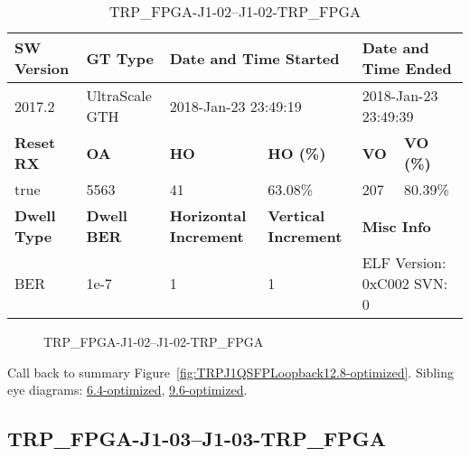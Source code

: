 \begin{table}[h]
\centering
\caption{TRP\_FPGA-J1-02--J1-02-TRP\_FPGA}
\label{tab:TRPFPGAJ102J102TRPFPGA12.8-optimized}
\begin{tabular}{@{}|l|l|l|l|l|l|@{}}
\toprule
\textbf{SW Version}                & \textbf{GT Type}   & \multicolumn{2}{l|}{\textbf{Date and Time Started}}            & \multicolumn{2}{l|}{\textbf{Date and Time Ended}}        \\ \midrule
2017.2                       & UltraScale GTH          & \multicolumn{2}{l|}{2018-Jan-23 23:49:19}                   & \multicolumn{2}{l|}{2018-Jan-23 23:49:39}               \\ \midrule
\textbf{Reset RX}                  & \textbf{OA} & \textbf{HO}   & \textbf{HO (\%)} & \textbf{VO} & \textbf{VO (\%)} \\ \midrule
true & 5563        & 41          & 63.08\%        & 207        & 80.39\%       \\ \midrule
\textbf{Dwell Type}                & \textbf{Dwell BER} & \textbf{Horizontal Increment} & \textbf{Vertical Increment}    & \multicolumn{2}{l|}{\textbf{Misc Info}}                  \\ \midrule
BER                            & 1e-7        & 1        & 1           & \multicolumn{2}{l|}{ELF Version: 0xC002 SVN: 0}                         \\ \bottomrule
\end{tabular}
\end{table}

\begin{figure}[h]
\caption{TRP\_FPGA-J1-02--J1-02-TRP\_FPGA} \label{fig:TRPFPGAJ102J102TRPFPGA12.8-optimized}
\end{figure}

Call back to summary Figure~\ref{fig:TRPJ1QSFPLoopback12.8-optimized}.
Sibling eye diagrams: \hyperref[sec:TRPFPGAJ102J102TRPFPGA6.4-optimized]{6.4-optimized}, \hyperref[sec:TRPFPGAJ102J102TRPFPGA9.6-optimized]{9.6-optimized}.

\clearpage
\newpage


\subsection{TRP\_FPGA-J1-03--J1-03-TRP\_FPGA}\label{sec:TRPFPGAJ103J103TRPFPGA12.8-optimized}

